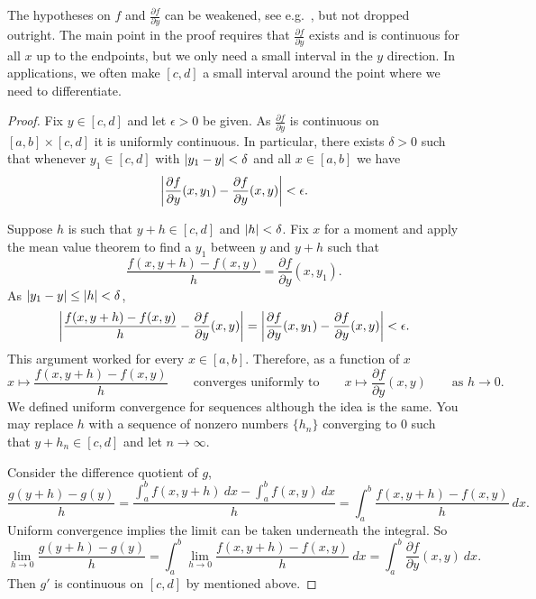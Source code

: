 The hypotheses on $f$ and $\frac{\partial f}{\partial y}$ can be
weakened, see e.g.\ ,
but not dropped outright.
The main point in the proof requires that
$\frac{\partial f}{\partial y}$ exists and is continuous for all $x$
up to the endpoints, but we only need a small
interval in the $y$ direction.  In applications, we often make $[c,d]$ a
small interval around the point where we need to differentiate.

\begin{proof}
Fix $y \in [c,d]$ and let $\epsilon > 0$ be given.
As $\frac{\partial f}{\partial y}$ is continuous on $[a,b] \times [c,d]$ it
is uniformly continuous.  In particular, there exists $\delta > 0$ such that
whenever $y_1 \in [c,d]$ with
$\left\lvert {y_1-y} \right\rvert < \delta$ and all $x \in [a,b]$ we have
\begin{equation*}
\left\lvert {\frac{\partial f}{\partial y}(x,y_1)-\frac{\partial f}{\partial y}(x,y)} \right\rvert < \epsilon .
\end{equation*}

Suppose $h$ is such that $y+h \in [c,d]$ and $\left\lvert {h} \right\rvert < \delta$.
Fix $x$ for a moment
and apply the mean value theorem to find a $y_1$ between $y$ and $y+h$ such that
\begin{equation*}
\frac{f(x,y+h)-f(x,y)}{h}
=
\frac{\partial f}{\partial y}(x,y_1) .
\end{equation*}
As $\left\lvert {y_1-y} \right\rvert \leq \left\lvert {h} \right\rvert < \delta$,
\begin{equation*}
\left\lvert {
\frac{f(x,y+h)-f(x,y)}{h}
-
\frac{\partial f}{\partial y}(x,y) 
} \right\rvert
=
\left\lvert {
\frac{\partial f}{\partial y}(x,y_1) 
-
\frac{\partial f}{\partial y}(x,y) 
} \right\rvert
< \epsilon .
\end{equation*}
This argument worked for every $x \in [a,b]$.  Therefore, as a function of
$x$
\begin{equation*}
x \mapsto \frac{f(x,y+h)-f(x,y)}{h}
\qquad
\text{converges uniformly to}
\qquad
x \mapsto \frac{\partial f}{\partial y}(x,y)
\qquad
\text{as } h \to 0 .
\end{equation*}
We defined uniform convergence for sequences although the idea is the
same.  You may replace $h$ with a sequence of nonzero 
numbers $\{ h_n \}$
converging to $0$ such that $y+h_n \in [c,d]$ and let $n \to \infty$.

Consider the difference quotient of $g$,
\begin{equation*}
\frac{g(y+h)-g(y)}{h}
=
\frac{\int_a^b f(x,y+h) ~dx -
\int_a^b f(x,y) ~dx }{h}
=
\int_a^b \frac{f(x,y+h)-f(x,y)}{h} ~dx .
\end{equation*}
Uniform convergence implies the limit can be taken underneath the integral.
So
\begin{equation*}
\lim_{h\to 0}
\frac{g(y+h)-g(y)}{h}
= 
\int_a^b 
\lim_{h\to 0}
\frac{f(x,y+h)-f(x,y)}{h} ~dx 
=
\int_a^b 
\frac{\partial f}{\partial y}(x,y) ~dx .
\end{equation*}
Then $g'$ is continuous on $[c,d]$ by
 mentioned above.
\end{proof}

